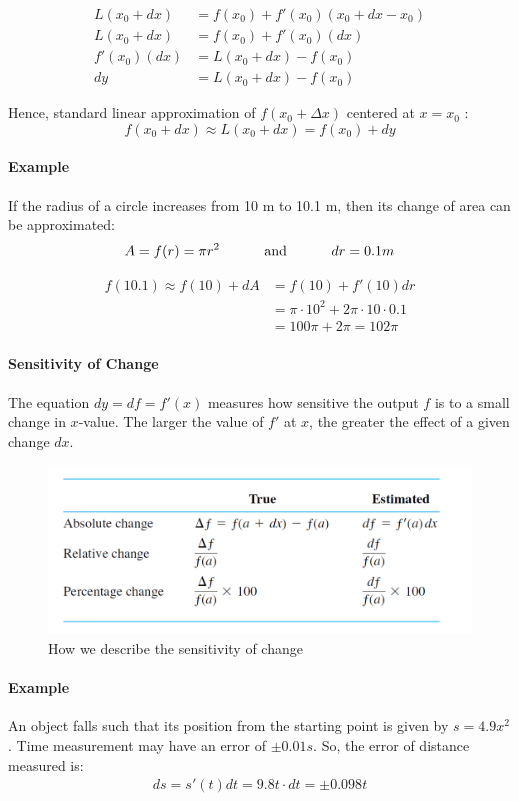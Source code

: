 \documentclass[12pt]{article}
\newcommand\tab[1][1cm]{\hspace*{#1}}
\begin{document}
\begin{align*} 
     L(x_0 + dx) &= f(x_0) + f'(x_0) (x_0 + dx - x_0) \\
     L(x_0 + dx) &= f(x_0) + f'(x_0) (dx) \\
     f'(x_0) (dx) &= L(x_0 + dx) - f(x_0) \\
     dy &= L(x_0 + dx) - f(x_0) 
\end{align*}

\noindent
Hence, standard linear approximation of $f(x_0 + \Delta x)$ centered at $x = x_0$ :
\[
    f(x_0 + dx) \approx L(x_0 + dx) = f(x_0) + dy
\]

\paragraph{Example} If the radius of a circle increases from 10 m to 10.1 m, then its change of area can be approximated:
\[
    A = f(r) = \pi r^2 \textrm{ \tab and \tab } dr = 0.1m
\]

\begin{align*} 
     f(10.1) \approx f(10) + dA &= f(10) + f'(10) dr \\
     &= \pi \cdot 10^2 + 2 \pi \cdot 10 \cdot 0.1 \\
     &= 100\pi + 2\pi = 102\pi 
\end{align*}

\paragraph{Sensitivity of Change}
The equation $dy = df = f'(x)$ measures how sensitive the output $f$ is to a small change in $x$-value.
The larger the value of $f'$ at $x$, the greater the effect of a given change $dx$.

\begin{figure}[h!]
    \centering
    \includegraphics[width = 0.6\linewidth]{Images/sensitivity.png}
    \caption{How we describe the sensitivity of change}
\end{figure}

\paragraph{Example}
An object falls such that its position from the starting point is given by $s = 4.9x^2$. Time measurement may have an error of $\pm 0.01 s$.
So, the error of distance measured is:
\begin{align*} 
     ds = s'(t)dt = 9.8t \cdot dt = \pm 0.098 t
\end{align*}
\end{document}
